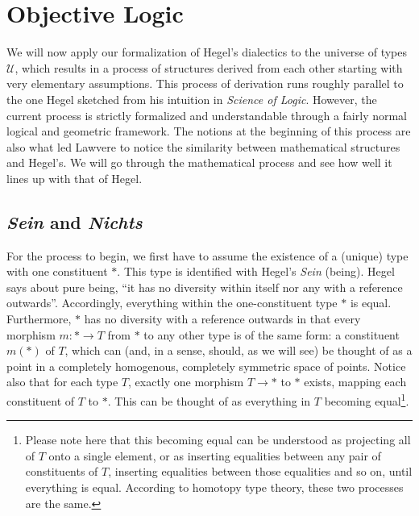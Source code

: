 \documentclass{article}
\begin{document}
\section{Objective Logic}
We will now apply our formalization of Hegel's dialectics to the universe of types $\mathcal{U}$, which results in a process of structures derived from each other starting with very elementary assumptions. This process of derivation runs roughly parallel to the one Hegel sketched from his intuition in \emph{Science of Logic}. However, the current process is strictly formalized and understandable through a fairly normal logical and geometric framework. The notions at the beginning of this process are also what led Lawvere to notice the similarity between mathematical structures and Hegel's. We will go through the mathematical process and see how well it lines up with that of Hegel.


\subsection{\emph{Sein} and \emph{Nichts}}
For the process to begin, we first have to assume the existence of a (unique) type with one constituent $*$. This type is identified with Hegel's \emph{Sein} (being). Hegel says about pure being, ``it has no diversity within itself nor any with a reference outwards''. Accordingly, everything within the one-constituent type $*$ is equal. Furthermore, $*$ has no diversity with a reference outwards in that every morphism $m:*\rightarrow T$ from $*$ to any other type is of the same form: a constituent $m(*)$ of $T$, which can (and, in a sense, should, as we will see) be thought of as a point in a completely homogenous, completely symmetric space of points. Notice also that for each type $T$, exactly one morphism $T\rightarrow *$ to $*$ exists, mapping each constituent of $T$ to $*$. This can be thought of as everything in $T$ becoming equal\footnote{Please note here that this becoming equal can be understood as projecting all of $T$ onto a single element, or as inserting equalities between any pair of constituents of $T$, inserting equalities between those equalities and so on, until everything is equal. According to homotopy type theory, these two processes are the same.}. \\ 
\end{document}
